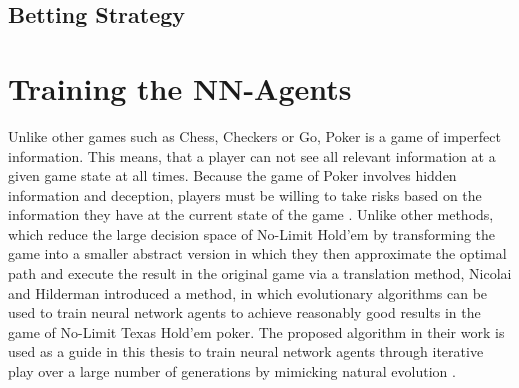 \subsection{Betting Strategy}
\label{subsec:betting}
\pagebreak
\section{Training the NN-Agents}
Unlike other games such as Chess, Checkers or Go, Poker is a game of imperfect information. This means, that a player can not see all relevant  information at a given game state at all times. Because the game of Poker involves hidden information and deception, players must be willing to take risks based on the information they have at the current state of the game \cite{nn_evolve}. Unlike other methods, which reduce the large decision space of No-Limit Hold'em by transforming the game into a smaller abstract version in which they then approximate the optimal path and execute the result in the original game via a translation method, Nicolai and Hilderman \cite{nn_evolve} introduced a method, in which evolutionary algorithms can be used to train neural network agents to achieve reasonably good results in the game of No-Limit Texas Hold'em poker. The proposed algorithm in their work is used as a guide in this thesis to train neural network agents through iterative play over a large number of generations by mimicking natural evolution \cite{nn_evolve}.
